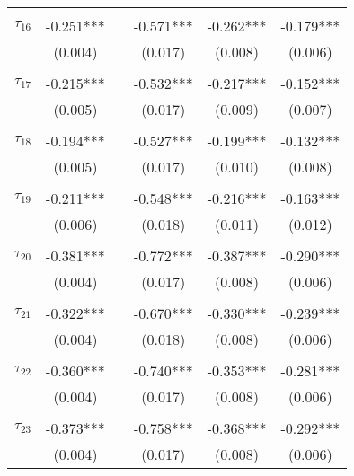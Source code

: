 \begin{tabular}{@{\extracolsep{-5pt}}lccccc}
                &           &&           &           &           \\[-2.1ex]
$\tau_{16}$     & -0.251*** && -0.571*** & -0.262*** & -0.179*** \\
                &  (0.004)  &&  (0.017)  &  (0.008)  &  (0.006)  \\
                &           &&           &           &           \\[-2.1ex]
$\tau_{17}$     & -0.215*** && -0.532*** & -0.217*** & -0.152*** \\
                &  (0.005)  &&  (0.017)  &  (0.009)  &  (0.007)  \\
                &           &&           &           &           \\[-2.1ex]
$\tau_{18}$     & -0.194*** && -0.527*** & -0.199*** & -0.132*** \\
                &  (0.005)  &&  (0.017)  &  (0.010)  &  (0.008)  \\
                &           &&           &           &           \\[-2.1ex]
$\tau_{19}$     & -0.211*** && -0.548*** & -0.216*** & -0.163*** \\
                &  (0.006)  &&  (0.018)  &  (0.011)  &  (0.012)  \\
                &           &&           &           &           \\[-2.1ex]
$\tau_{20}$     & -0.381*** && -0.772*** & -0.387*** & -0.290*** \\
                &  (0.004)  &&  (0.017)  &  (0.008)  &  (0.006)  \\
                &           &&           &           &           \\[-2.1ex]
$\tau_{21}$     & -0.322*** && -0.670*** & -0.330*** & -0.239*** \\
                &  (0.004)  &&  (0.018)  &  (0.008)  &  (0.006)  \\
                &           &&           &           &           \\[-2.1ex]
$\tau_{22}$     & -0.360*** && -0.740*** & -0.353*** & -0.281*** \\
                &  (0.004)  &&  (0.017)  &  (0.008)  &  (0.006)  \\
                &           &&           &           &           \\[-2.1ex]
$\tau_{23}$     & -0.373*** && -0.758*** & -0.368*** & -0.292*** \\
                &  (0.004)  &&  (0.017)  &  (0.008)  &  (0.006)  \\

\end{tabular}
